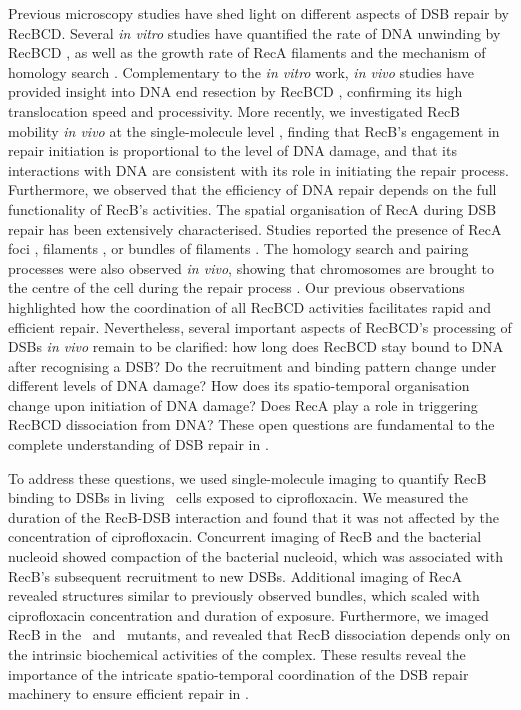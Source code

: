 Previous microscopy studies have shed light on different aspects of DSB repair by RecBCD. Several \emph{in vitro} studies have quantified the rate of DNA unwinding by RecBCD \cite{Spies2003,Liu2013}, as well as the growth rate of RecA filaments \cite{Joo2006,Galletto2006,Handa2009} and the mechanism of homology search \cite{Forget2012,Ragunathan2012}. Complementary to the \emph{in vitro} work, \emph{in vivo} studies have provided insight into DNA end resection by RecBCD \cite{Wiktor2018}, confirming its high translocation speed and processivity. More recently, we investigated RecB mobility \emph{in vivo} at the single-molecule level \cite{Lepore2025}, finding that RecB's engagement in repair initiation is proportional to the level of DNA damage, and that its interactions with DNA are consistent with its role in initiating the repair process. Furthermore, we observed that the efficiency of DNA repair depends on the full functionality of RecB’s activities. The spatial organisation of RecA during DSB repair has been extensively characterised. Studies reported the presence of RecA foci \cite{Renzette2005,Renzette2007,Centore2007,Amarh2018}, filaments \cite{Kidane2005}, or bundles of filaments \cite{Lesterlin2013,Ghodke2019}. The homology search and pairing processes were also observed \emph{in vivo}, showing that chromosomes are brought to the centre of the cell during the repair process \cite{Badrinarayanan2015,Wiktor2021}. Our previous observations \cite{Lepore2025} highlighted how the coordination of all RecBCD activities facilitates rapid and efficient repair. Nevertheless, several important aspects of RecBCD's processing of DSBs \emph{in vivo} remain to be clarified: how long does RecBCD stay bound to DNA after recognising a DSB? Do the recruitment and binding pattern change under different levels of DNA damage? How does its spatio-temporal organisation change upon initiation of DNA damage? Does RecA play a role in triggering RecBCD dissociation from DNA? These open questions are fundamental to the complete understanding of DSB repair in \ecoli.

To address these questions, we used single-molecule imaging to quantify RecB binding to DSBs in living \ecoli\ cells exposed to ciprofloxacin. We measured the duration of the RecB-DSB interaction and found that it was not affected by the concentration of ciprofloxacin. Concurrent imaging of RecB and the bacterial nucleoid showed compaction of the bacterial nucleoid, which was associated with RecB's subsequent recruitment to new DSBs. Additional imaging of  RecA revealed structures similar to previously observed bundles, which scaled with ciprofloxacin concentration and duration of exposure. Furthermore, we imaged RecB in the \dreca\ and \geneteneighty\ mutants, and revealed that RecB dissociation depends only on the intrinsic biochemical activities of the complex. These results reveal the importance of the intricate spatio-temporal coordination of the DSB repair machinery to ensure efficient repair in \ecoli.
